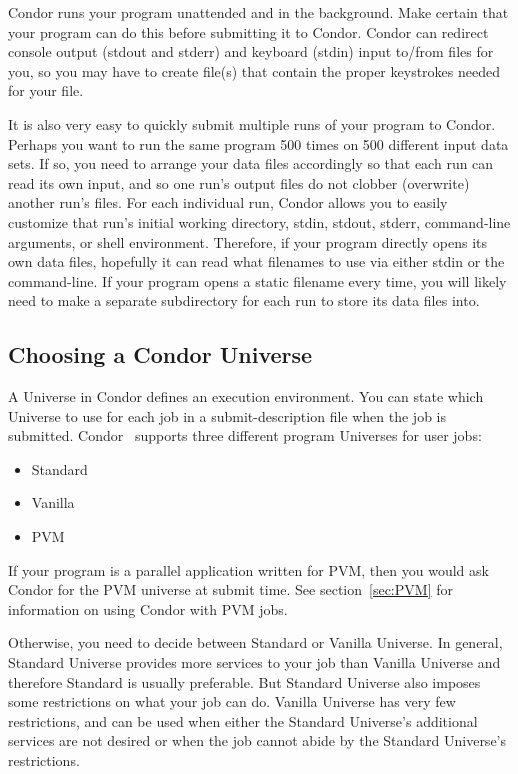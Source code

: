 Condor runs your program unattended and in the background. Make certain
that your program can do this before submitting it to Condor. Condor can
redirect console output (stdout and stderr) and keyboard (stdin) input
to/from files for you, so you may have to create file(s) that contain
the proper keystrokes needed for your file.

It is also very easy to quickly submit multiple runs of your program to
Condor. Perhaps you want to run the same program 500 times on 500
different input data sets. If so, you need to arrange your data files
accordingly so that each run can read its own input, and so one run's
output files do not clobber (overwrite) another run's files. For each
individual run, Condor allows you to easily customize that run's initial
working directory, stdin, stdout, stderr, command-line arguments, or
shell environment. Therefore, if your program directly opens its own
data files, hopefully it can read what filenames to use via either stdin
or the command-line. If your program opens a static filename every time,
you will likely need to make a separate subdirectory for each run to
store its data files into.

\subsection{Choosing a Condor Universe}

A Universe in Condor defines an execution environment. You can state
which Universe to use for each job in a submit-description file when the
job is submitted. Condor \VersionNotice\ supports three different
program Universes for user jobs:
\begin{itemize}
	\item Standard
	\item Vanilla
	\item PVM
\end{itemize}

If your program is a parallel application written for PVM, then you
would ask Condor for the PVM universe at submit time.  See
section~\ref{sec:PVM} for information on using Condor with PVM jobs.

Otherwise, you need to decide between Standard or Vanilla Universe.
In general, Standard Universe provides more services to your job than
Vanilla Universe and therefore Standard is usually preferable.  But 
Standard Universe also imposes some restrictions on
what your job can do.  Vanilla Universe has very few restrictions, and
can be used when either the Standard Universe's additional services are not
desired or when the job cannot abide by the Standard Universe's
restrictions.

